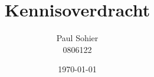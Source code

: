 \documentclass[a4paper,11pt]{report}
\begin{document}
\title{
  Kennisoverdracht
}
\author{
  Paul Sohier\\
  0806122
}
\date{\today}
\maketitle



{}

\setcounter{page}{3}

%
%
%

\end{document}
